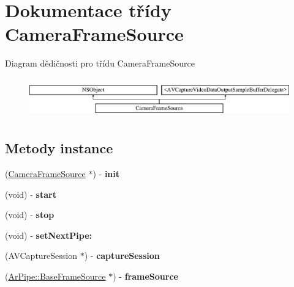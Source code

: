 \hypertarget{interface_camera_frame_source}{\section{Dokumentace třídy Camera\-Frame\-Source}
\label{db/dad/interface_camera_frame_source}
}
Diagram dědičnosti pro třídu Camera\-Frame\-Source\begin{figure}[H]
\begin{center}
\leavevmode
\includegraphics[height=1.755486cm]{db/dad/interface_camera_frame_source}
\end{center}
\end{figure}
\subsection*{Metody instance}
\begin{DoxyCompactItemize}
\item 
\hypertarget{interface_camera_frame_source_a05f4a47427d18144c0a2569db43ac337}{(\hyperlink{interface_camera_frame_source}{Camera\-Frame\-Source} $\ast$) -\/ {\bfseries init}}\label{db/dad/interface_camera_frame_source_a05f4a47427d18144c0a2569db43ac337}

\item 
\hypertarget{interface_camera_frame_source_a40ad8bd44e575a186f6ba5af67788312}{(void) -\/ {\bfseries start}}\label{db/dad/interface_camera_frame_source_a40ad8bd44e575a186f6ba5af67788312}

\item 
\hypertarget{interface_camera_frame_source_a68592d8757b77020ad1070631e3f30ee}{(void) -\/ {\bfseries stop}}\label{db/dad/interface_camera_frame_source_a68592d8757b77020ad1070631e3f30ee}

\item 
\hypertarget{interface_camera_frame_source_ac3d33c3ba7a81860c470ede51d46e2ba}{(void) -\/ {\bfseries set\-Next\-Pipe\-:}}\label{db/dad/interface_camera_frame_source_ac3d33c3ba7a81860c470ede51d46e2ba}

\item 
\hypertarget{interface_camera_frame_source_a67ad083cf405ccb4efc57232c2c8c298}{(A\-V\-Capture\-Session $\ast$) -\/ {\bfseries capture\-Session}}\label{db/dad/interface_camera_frame_source_a67ad083cf405ccb4efc57232c2c8c298}

\item 
\hypertarget{interface_camera_frame_source_a07057a809be7d76563d0e7dbb0d6fd1a}{(\hyperlink{class_ar_pipe_1_1_base_frame_source}{Ar\-Pipe\-::\-Base\-Frame\-Source} $\ast$) -\/ {\bfseries frame\-Source}}\label{db/dad/interface_camera_frame_source_a07057a809be7d76563d0e7dbb0d6fd1a}

\end{DoxyCompactItemize}
